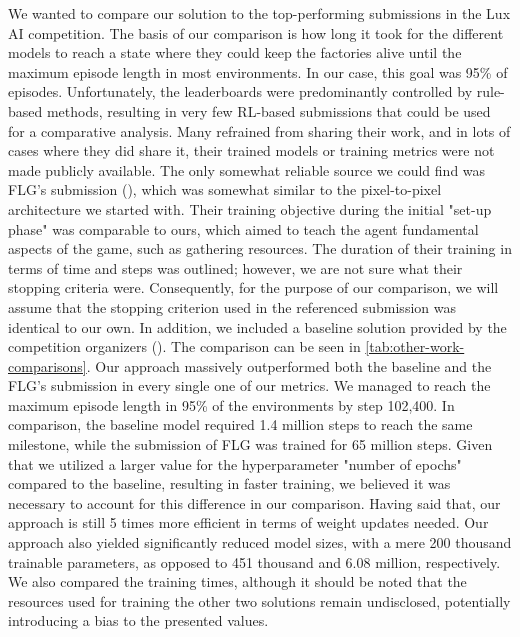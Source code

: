 \bigskip

\noindent We wanted to compare our solution to the top-performing submissions in the Lux AI competition. The basis of our comparison is how long it took for the different models to reach a state where they could keep the factories alive until the maximum episode length in most environments. In our case, this goal was 95\% of episodes. Unfortunately, the leaderboards were predominantly controlled by rule-based methods, resulting in very few RL-based submissions that could be used for a comparative analysis. Many refrained from sharing their work, and in lots of cases where they did share it, their trained models or training metrics were not made publicly available. The only somewhat reliable source we could find was FLG's submission (\cite{ferdinand}), which was somewhat similar to the pixel-to-pixel architecture we started with. Their training objective during the initial "set-up phase" was comparable to ours, which aimed to teach the agent fundamental aspects of the game, such as gathering resources. The duration of their training in terms of time and steps was outlined; however, we are not sure what their stopping criteria were. Consequently, for the purpose of our comparison, we will assume that the stopping criterion used in the referenced submission was identical to our own. In addition, we included a baseline solution provided by the competition organizers (\cite{luxai_s2-baseline-source}). The comparison can be seen in \autoref{tab:other-work-comparisons}. Our approach massively outperformed both the baseline and the FLG's submission in every single one of our metrics. We managed to reach the maximum episode length in 95\% of the environments by step 102,400. In comparison, the baseline model required 1.4 million steps to reach the same milestone, while the submission of FLG was trained for 65 million steps. Given that we utilized a larger value for the hyperparameter "number of epochs" compared to the baseline, resulting in faster training, we believed it was necessary to account for this difference in our comparison. Having said that, our approach is still 5 times more efficient in terms of weight updates needed. Our approach also yielded significantly reduced model sizes, with a mere 200 thousand trainable parameters, as opposed to 451 thousand and 6.08 million, respectively. We also compared the training times, although it should be noted that the resources used for training the other two solutions remain undisclosed, potentially introducing a bias to the presented values.


